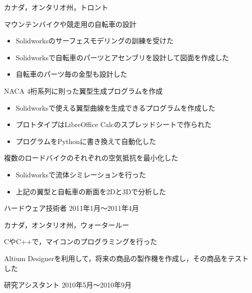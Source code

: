 \documentclass[10pt, a4paper]{article}
\begin{document}
\begin{outerlist}
\vspace{-\baselineskip}    
\hfill カナダ，オンタリオ州，トロント
  \begin{innerlist}
  \item マウンテンバイクや競走用の自転車の設計
  \begin{itemize}
    \item Solidworksのサーフェスモデリングの訓練を受けた
    \item Solidworksで自転車のパーツとアセンブリを設計して図面を作成した
    \item 自転車のパーツ毎の金型も設計した
  \end{itemize}
  \item NACA 4桁系列に則った翼型生成プログラムを作成
  \begin{itemize}
    \item Solidworksで使える翼型曲線を生成できるプログラムを作成した
    \item プロトタイプはLibreOffice Calcのスプレッドシートで作られた
    \item プログラムをPythonに書き換えて自動化した
  \end{itemize}
  \item 複数のロードバイクのそれぞれの空気抵抗を最小化した
  \begin{itemize}
    \item Solidworksで流体シミレーションを行った
    \item 上記の翼型と自転車の断面を2Dと3Dで分析した
  \end{itemize}
  \end{innerlist}

\item[\href{http://www.intellimec.com/}{\parbox[t]{3cm}{\raggedleft Intelligent Mechatronics Systems株式会社}}]{ハードウェア技術者} \hfill {2011年1月〜2011年4月}

\vspace{-2\baselineskip}
\hfill カナダ，オンタリオ州，ウォータールー
  \begin{innerlist}
  \item CやC++で，マイコンのプログラミングを行った
  \item Altium Designerを利用して，将来の商品の製作機を作成し，その商品をテストした
  \end{innerlist}

\item[\href{http://rpl.uwaterloo.ca/}{\parbox[t]{3cm}{\raggedleft ウォータールー大学\\マルチスケール\\積層造形研究室}}]{研究アシスタント} \hfill {2010年5月〜2010年9月}


\end{outerlist}
\end{document}
